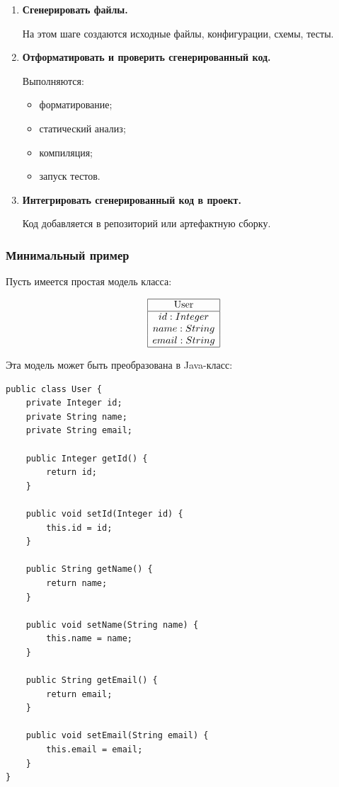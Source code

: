 \documentclass[12pt,a4paper]{article}
\begin{document}
\begin{enumerate}
    Для каждого элемента модели создаются соответствующие программные конструкции.

    \item \textbf{Сгенерировать файлы.}

    На этом шаге создаются исходные файлы, конфигурации, схемы, тесты.

    \item \textbf{Отформатировать и проверить сгенерированный код.}

    Выполняются:
    \begin{itemize}
        \item форматирование;
        \item статический анализ;
        \item компиляция;
        \item запуск тестов.
    \end{itemize}

    \item \textbf{Интегрировать сгенерированный код в проект.}

    Код добавляется в репозиторий или артефактную сборку.
\end{enumerate}

\subsubsection{Минимальный пример}

Пусть имеется простая модель класса:

\[
\begin{array}{|c|}
\hline
\text{User} \\
\hline
id: Integer \\
name: String \\
email: String \\
\hline
\end{array}
\]

Эта модель может быть преобразована в Java-класс:

\begin{verbatim}
public class User {
    private Integer id;
    private String name;
    private String email;

    public Integer getId() {
        return id;
    }

    public void setId(Integer id) {
        this.id = id;
    }

    public String getName() {
        return name;
    }

    public void setName(String name) {
        this.name = name;
    }

    public String getEmail() {
        return email;
    }

    public void setEmail(String email) {
        this.email = email;
    }
}
\end{verbatim}
\end{document}
